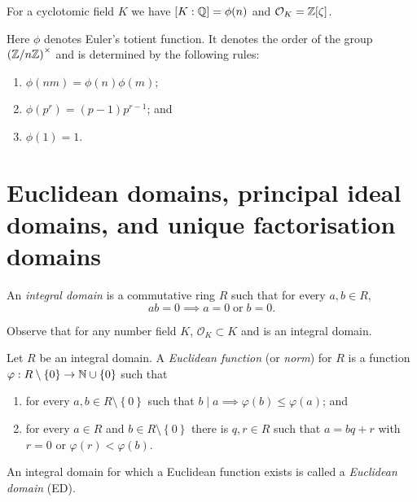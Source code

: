 
\begin{theorem}[]
	For a cyclotomic field $K$ we have
	$[K:\mathbb{Q}] = \phi(n)$ and $\mathcal O_K = \mathbb{Z}[\zeta]$.
\end{theorem}

Here $\phi$ denotes Euler's totient function.
It denotes the order of the group $\left( 
	\mathbb{Z}/n\mathbb{Z} 
\right)^\times$ and is determined by the following rules:
\begin{enumerate}
	\item $\phi(nm) = \phi(n) \phi(m)$;
	\item $\phi(p^r) = (p-1)p^{r-1}$; and
	\item $\phi(1) = 1$.
\end{enumerate}

\section{Euclidean domains, principal ideal domains, and unique factorisation
domains}

\begin{definition}
	An \emph{integral domain} is a commutative ring $R$ such that for every
	$a, b \in R$,
	\[
		ab = 0 \implies a = 0 \;\text{or}\; b = 0.
	\]
\end{definition}

Observe that for any number field $K$,
$\mathcal O_K \subset K$ and is an integral domain.

\begin{definition}
	Let $R$ be an integral domain.
	A \emph{Euclidean function} (or \emph{norm}) for $R$ is a function
	$\varphi: R \setminus \left\{
		0
	\right\} \to \mathbb{N} \cup \left\{
		0
	\right\}$ such that
	\begin{enumerate}
		\item for every $a, b \in R \setminus \left\{
			0
		\right\}$ such that $b \mid a \implies \varphi(b) \leq \varphi(a)$; and
		
		\item for every $a \in R$ and $b \in R \setminus \left\{
			0
		\right\}$ there is $q, r \in R$ such that
		$a = bq + r$ with $r = 0$ or $\varphi(r) < \varphi(b)$.
	\end{enumerate}
\end{definition}

\begin{definition}
	An integral domain for which a Euclidean function exists is called a
	\emph{Euclidean domain} (ED).
\end{definition}

